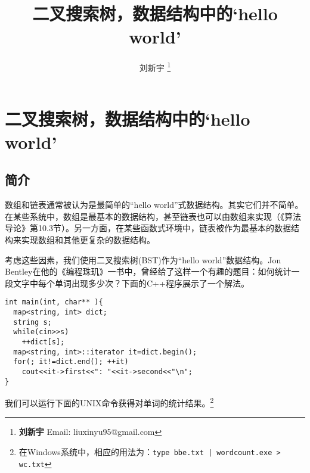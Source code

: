\documentclass[UTF8]{article}
\begin{document}


\title{二叉搜索树，数据结构中的`hello world'}

\author{刘新宇
\thanks{{\bfseries 刘新宇} \newline
  Email: liuxinyu95@gmail.com \newline}
  }

\maketitle
\fi


\ifx\wholebook\relax
\chapter{二叉搜索树，数据结构中的`hello world'}
\fi

\section{简介}
\label{introduction} 

数组和链表通常被认为是最简单的“hello world”式数据结构。其实它们并不简单。在某些系统中，数组是最基本的数据结构，甚至链表也可以由数组来实现（《算法导论》第10.3节\cite{CLRS}）。另一方面，在某些函数式环境中，链表被作为最基本的数据结构来实现数组和其他更复杂的数据结构。

考虑这些因素，我们使用二叉搜索树(BST)作为“hello world”数据结构。Jon Bentley在他的《编程珠玑》一书中，曾经给了这样一个有趣的题目\cite{Bentley}：如何统计一段文字中每个单词出现多少次？下面的C++程序展示了一个解法。

\lstset{language=C++}
\begin{lstlisting}
int main(int, char** ){
  map<string, int> dict;
  string s;
  while(cin>>s)
    ++dict[s];
  map<string, int>::iterator it=dict.begin();
  for(; it!=dict.end(); ++it)
    cout<<it->first<<": "<<it->second<<"\n";
}
\end{lstlisting}

我们可以运行下面的UNIX命令获得对单词的统计结果。\footnote{在Windows系统中，相应的用法为：\texttt{type bbe.txt | wordcount.exe > wc.txt}}
\end{document}
